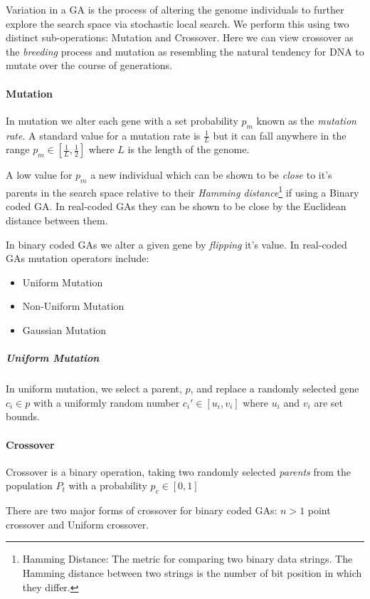 Variation in a GA is the process of altering the genome individuals to further explore the search space via stochastic local search.
We perform this using two distinct sub-operations: Mutation and Crossover.
Here we can view crossover as the \textit{breeding} process and mutation as resembling the natural tendency for DNA to mutate over the course of generations.

\paragraph{Mutation}
In mutation we alter each gene with a set probability $p_m$ known as the \textit{mutation rate}. A standard value for a mutation rate is $ \frac{1}{L} $ but it can fall anywhere in the range $p_m \in [ \frac{1}{L} , \frac{1}{2} ] $ where $L$ is the length of the genome.

A low value for $p_m$ a new individual which can be shown to be \textit{close} to it's parents in the search space relative to their \textit{Hamming distance}\footnote{Hamming Distance: The metric for comparing two binary data strings. The Hamming distance between two strings is the number of bit position in which they differ.} if using a Binary coded GA. In real-coded GAs they can be shown to be close by the Euclidean distance between them.

In binary coded GAs we alter a given gene by \textit{flipping} it's value.
In real-coded GAs mutation operators include: 
\begin{itemize}
    \item Uniform Mutation
    \item Non-Uniform Mutation
    \item Gaussian Mutation 
\end{itemize}
\subparagraph{Uniform Mutation}
In uniform mutation, we select a parent, $p$, and replace a randomly selected gene $c_i \in p$ with a uniformly random number $c_i' \in [u_i,v_i]$  where $u_i$ and $v_i$ are set bounds.


\paragraph{Crossover}

Crossover is a binary operation, taking two randomly selected \textit{parents} from the population $P_t$ with a probability $p_c \in [0,1]$ 

There are two major forms of crossover for binary coded GAs: $n>1$ point crossover and Uniform crossover. 

